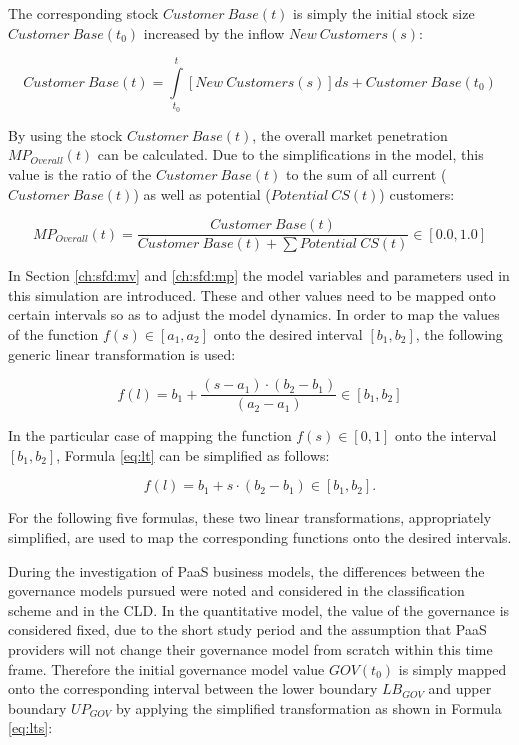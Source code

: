 The corresponding stock $Customer~Base(t)$ is simply the initial stock size $\mathit{Customer~Base(t_0)}$ increased by the inflow $New~Customers(s)$:

\begin{equation}\label{eq:cb}
	\mathit{Customer~Base(t)} = \int\limits_{t_0}^t \mathit{[New~Customers(s)]ds} + \mathit{Customer~Base(t_0)}
\end{equation}

By using the stock $Customer~Base(t)$, the overall market penetration $MP_{Overall}(t)$ can be calculated. Due to the simplifications in the model, this value is the ratio of the $Customer~Base(t)$ to the sum of all current \linebreak ($Customer~Base(t)$) as well as potential ($Potential~CS(t)$) customers:

\begin{equation}\label{eq:mpo}
	MP_{Overall}(t) = \frac{\mathit{Customer~Base(t)}}{\mathit{Customer~Base(t)} + \sum \mathit{Potential~CS(t)}} \in [0.0,1.0]
\end{equation}

In Section \ref{ch:sfd:mv} and \ref{ch:sfd:mp} the model variables and parameters used in this simulation are introduced. These and other values need to be mapped onto certain intervals so as to adjust the model dynamics. In order to map the values of the function $f(s) \in [a_1,a_2]$ onto the desired interval $[b_1,b_2]$, the following generic linear transformation is used:

\begin{equation}\label{eq:lt}
	f(l) = b_{1} + \frac{(s-a_1) \cdot (b_2-b_1)}{(a_2-a_1)} \in [b_1,b_2]
\end{equation}

In the particular case of mapping the function $f(s) \in [0,1]$ onto the interval $[b_1,b_2]$, Formula \ref{eq:lt} can be simplified as follows:

\begin{equation}\label{eq:lts}
	f(l) = b_{1} + s \cdot (b_{2}-b_{1}) \in [b_{1},b_{2}].
\end{equation}

For the following five formulas, these two linear transformations, appropriately simplified, are used to map the corresponding functions onto the desired intervals.

During the investigation of \ac{PaaS} business models, the differences between the governance models pursued were noted and considered in the classification scheme and in the \ac{CLD}. In the quantitative model, the value of the governance is considered fixed, due to the short study period and the assumption that \ac{PaaS} providers will not change their governance model from scratch within this time frame. Therefore the initial governance model value $GOV(t_0)$ is simply mapped onto the corresponding interval between the lower boundary $LB_{GOV}$ and upper boundary $UP_{GOV}$ by applying the simplified transformation as shown in Formula \ref{eq:lts}:

